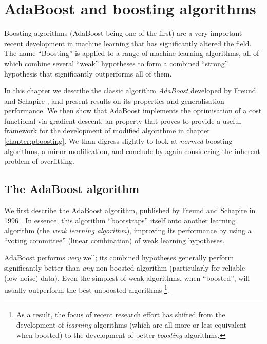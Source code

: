 

\chapter{AdaBoost and boosting algorithms}
\label{chapter:boosting}

Boosting algorithms (AdaBoost being one of the first) are a very
important recent development in machine learning that has
significantly altered the field.  The name ``Boosting'' is applied to
a range of  machine learning algorithms, all of which combine several
``weak'' hypotheses to form a combined ``strong'' hypothesis that
significantly outperforms all of them.

In this chapter we describe the classic algorithm \emph{AdaBoost}
developed by Freund and Schapire \cite{Freund96}, and present results
on its properties and generalisation performance.  We then show that
AdaBoost implements the optimisation of a cost functional via gradient
descent, an property that proves to provide a useful framework for the
development of modified algorithme in chapter \ref{chapter:pboosting}.
We than digress slightly to look at \emph{normed} boosting algorithms,
a minor modification, and conclude by again considering the inherent
problem of overfitting.

\section{The AdaBoost algorithm}

We first describe the AdaBoost algorithm, published by Freund and
Schapire in 1996 \cite{Freund96}.  In essence, this algorithm 
``bootstraps'' itself onto another learning algorithm (the \emph{weak
learning algorithm}), improving its performance by using a ``voting
committee'' (linear combination) of weak learning hypotheses.

AdaBoost performs \emph{very} well; its combined hypotheses generally
perform significantly better than \emph{any} non-boosted algorithm
(particularly for reliable (low-noise) data).  Even the simplest of
weak algorithms, when ``boosted'', will usually outperform the best
unboosted algorithms%
\footnote{As a result, the focus of recent research effort has shifted
from the development of \emph{learning} algorithms (which are all more 
or less equivalent when boosted) to the development of better
\emph{boosting} algorithms.}.

